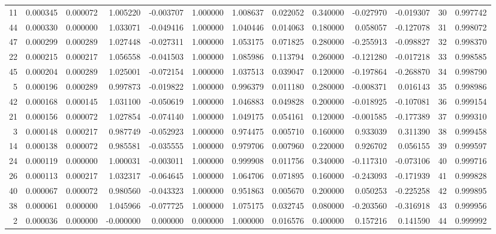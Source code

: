 \begin{tabular}{rrrrrrrrrrrrr}
11 & 0.000345 & 0.000072 & 1.005220 & -0.003707 & 1.000000 & 1.008637 & 0.022052 & 0.340000 & -0.027970 & -0.019307 & 30 & 0.997742 \\
44 & 0.000330 & 0.000000 & 1.033071 & -0.049416 & 1.000000 & 1.040446 & 0.014063 & 0.180000 & 0.058057 & -0.127078 & 31 & 0.998072 \\
47 & 0.000299 & 0.000289 & 1.027448 & -0.027311 & 1.000000 & 1.053175 & 0.071825 & 0.280000 & -0.255913 & -0.098827 & 32 & 0.998370 \\
22 & 0.000215 & 0.000217 & 1.056558 & -0.041503 & 1.000000 & 1.085986 & 0.113794 & 0.260000 & -0.121280 & -0.017218 & 33 & 0.998585 \\
45 & 0.000204 & 0.000289 & 1.025001 & -0.072154 & 1.000000 & 1.037513 & 0.039047 & 0.120000 & -0.197864 & -0.268870 & 34 & 0.998790 \\
5 & 0.000196 & 0.000289 & 0.997873 & -0.019822 & 1.000000 & 0.996379 & 0.011180 & 0.280000 & -0.008371 & 0.016143 & 35 & 0.998986 \\
42 & 0.000168 & 0.000145 & 1.031100 & -0.050619 & 1.000000 & 1.046883 & 0.049828 & 0.200000 & -0.018925 & -0.107081 & 36 & 0.999154 \\
21 & 0.000156 & 0.000072 & 1.027854 & -0.074140 & 1.000000 & 1.049175 & 0.054161 & 0.120000 & -0.001585 & -0.177389 & 37 & 0.999310 \\
3 & 0.000148 & 0.000217 & 0.987749 & -0.052923 & 1.000000 & 0.974475 & 0.005710 & 0.160000 & 0.933039 & 0.311390 & 38 & 0.999458 \\
14 & 0.000138 & 0.000072 & 0.985581 & -0.035555 & 1.000000 & 0.979706 & 0.007960 & 0.220000 & 0.926702 & 0.056155 & 39 & 0.999597 \\
24 & 0.000119 & 0.000000 & 1.000031 & -0.003011 & 1.000000 & 0.999908 & 0.011756 & 0.340000 & -0.117310 & -0.073106 & 40 & 0.999716 \\
26 & 0.000113 & 0.000217 & 1.032317 & -0.064645 & 1.000000 & 1.064706 & 0.071895 & 0.160000 & -0.243093 & -0.171939 & 41 & 0.999828 \\
40 & 0.000067 & 0.000072 & 0.980560 & -0.043323 & 1.000000 & 0.951863 & 0.005670 & 0.200000 & 0.050253 & -0.225258 & 42 & 0.999895 \\
38 & 0.000061 & 0.000000 & 1.045966 & -0.077725 & 1.000000 & 1.075175 & 0.032745 & 0.080000 & -0.203560 & -0.316918 & 43 & 0.999956 \\
2 & 0.000036 & 0.000000 & -0.000000 & 0.000000 & 0.000000 & 1.000000 & 0.016576 & 0.400000 & 0.157216 & 0.141590 & 44 & 0.999992 \\

\end{tabular}

